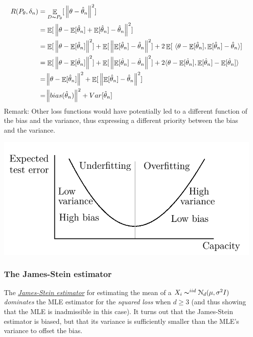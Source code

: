\documentclass[12pt]{report}
\DeclareMathOperator{\E}{\mathbb{E}}
\begin{document}
\begin{align}
R(P_\theta,\delta_n) &= \E_{D \thicksim P_\theta}[\ \norm{\theta - \hat{\theta}_n}^2]\\
&=\E[\ \norm{\theta -\E[\hat{\theta}_n] + \E[\hat{\theta}_n] - \hat{\theta}_n}^2]\\
&=\E[\ \norm{\theta -\E[\hat{\theta}_n]}^2] + \E[\ \norm{\E[\hat{\theta}_n] - \hat{\theta}_n}^2] + 2\E[\ \langle\theta-\E[\hat{\theta}_n],\E[\hat{\theta}_n] - \hat{\theta}_n\rangle]\\
&=\E[\ \norm{\theta -\E[\hat{\theta}_n]}^2] + \E[\ \norm{\E[\hat{\theta}_n] - \hat{\theta}_n}^2] + 2\langle\theta-\E[\hat{\theta}_n],\E[\hat{\theta}_n] - \E[\hat{\theta}_n]\rangle\\
&=\norm{\theta -\E[\hat{\theta}_n]}^2 + \E[\ \norm{\E[\hat{\theta}_n] - \hat{\theta}_n}^2]\\
&=\norm{bias(\hat{\theta}_n)}^2 + Var[\hat{\theta}_n]
\end{align}
Remark: Other loss functions would have potentially led to a different function of the bias and the variance, thus expressing a different priority between the bias and the variance.

\centerline{\includegraphics[scale=0.5]{graph_4.png}}

\subsubsection{The James-Stein estimator}
The \href{https://en.wikipedia.org/wiki/James-Stein\_estimator}{\textit{James-Stein estimator}} for estimating the mean of a $X_i \thicksim^{iid}\mathcal{N}_d(\mu,\sigma^2I)$ \textit{dominates} the MLE estimator for the \textit{squared loss} when $d\geq 3$ (and thus showing that the MLE is inadmissible in this case). It turns out that the James-Stein estimator is biased, but that its variance is sufficiently smaller than the MLE's variance to offset the bias.
\end{document}
